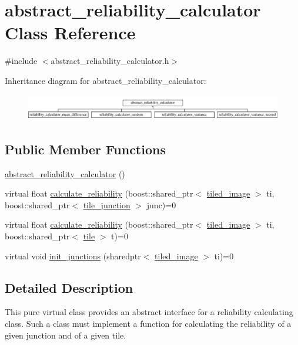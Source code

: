 \hypertarget{classabstract__reliability__calculator}{\section{abstract\-\_\-reliability\-\_\-calculator Class Reference}
\label{classabstract__reliability__calculator}
}


{\ttfamily \#include $<$abstract\-\_\-reliability\-\_\-calculator.\-h$>$}

Inheritance diagram for abstract\-\_\-reliability\-\_\-calculator\-:\begin{figure}[H]
\begin{center}
\leavevmode
\includegraphics[height=1.171548cm]{classabstract__reliability__calculator}
\end{center}
\end{figure}
\subsection*{Public Member Functions}
\begin{DoxyCompactItemize}
\item 
\hyperlink{classabstract__reliability__calculator_ac28dfe44888c3beb9d6ceeaeea1c99a7}{abstract\-\_\-reliability\-\_\-calculator} ()
\item 
virtual float \hyperlink{classabstract__reliability__calculator_a0c9a7778550b643b6a273e3bf0662023}{calculate\-\_\-reliability} (boost\-::shared\-\_\-ptr$<$ \hyperlink{classtiled__image}{tiled\-\_\-image} $>$ ti, boost\-::shared\-\_\-ptr$<$ \hyperlink{classtile__junction}{tile\-\_\-junction} $>$ junc)=0
\item 
virtual float \hyperlink{classabstract__reliability__calculator_a496b1743c17660ae4617eebdd312bb9d}{calculate\-\_\-reliability} (boost\-::shared\-\_\-ptr$<$ \hyperlink{classtiled__image}{tiled\-\_\-image} $>$ ti, boost\-::shared\-\_\-ptr$<$ \hyperlink{classtile}{tile} $>$ t)=0
\item 
virtual void \hyperlink{classabstract__reliability__calculator_a4457d3eece3c873e2cc2455a6dfdbb88}{init\-\_\-junctions} (sharedptr$<$ \hyperlink{classtiled__image}{tiled\-\_\-image} $>$ ti)=0
\end{DoxyCompactItemize}


\subsection{Detailed Description}
This pure virtual class provides an abstract interface for a reliability calculating class. Such a class must implement a function for calculating the reliability of a given junction and of a given tile. 


